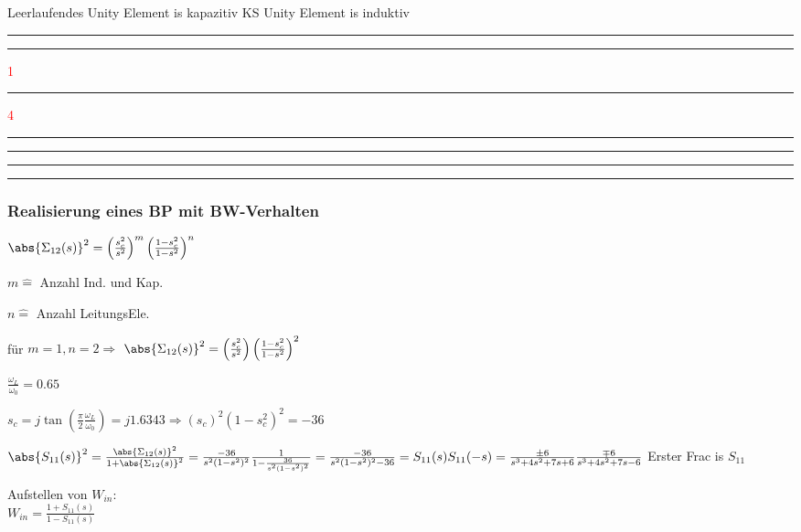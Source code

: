 Leerlaufendes Unity Element is kapazitiv
KS Unity Element is induktiv


\hrule
{}
\hrule
{}
\textcolor{red}{1}
\hrule
{}
\textcolor{red}{4}
\hrule
{}
\hrule
{}
\hrule
{}
\hrule
{}



\subsubsection{Realisierung eines BP mit BW-Verhalten}

$\abs{\Sigma_{12}(s)}^2 = \left(\frac{s_c^2}{s^2}\right)^m \left(\frac{1 - s_c^2}{1 - s^2}\right)^n$
\begin{pitemize}
    \item $m \hat{=}$ Anzahl Ind. und Kap.
    \item $n \hat{=}$ Anzahl LeitungsEle.
\end{pitemize}

für $m=1, n=2 \Rightarrow$
$\abs{\Sigma_{12}(s)}^2 = \left(\frac{s_c^2}{s^2}\right) \left(\frac{1 - s_c^2}{1 - s^2}\right)^2$


$\frac{\omega_L}{\omega_0} = 0.65$

$s_c = j \tan(\frac{\pi}{2} \frac{\omega_L}{\omega_0}) = j1.6343 \Rightarrow (s_c)^2(1 - s_c^2)^2 = -36$

$\abs{S_{11}(s)}^2 = \frac{\abs{\Sigma_{12}(s)}^2}{1 + \abs{\Sigma_{12}(s)}^2} = \frac{-36}{s^2 (1- s^2)^2} \frac{1}{1 - \frac{36}{s^2 (1- s^2)^2}} = \frac{-36}{s^2(1-s^2)^2 - 36} = S_{11}(s)S_{11}(-s) = \frac{\pm 6}{s^3 + 4s^2 + 7s + 6} \frac{\mp 6}{s^3 + 4s^2 + 7s - 6}$ Erster Frac is $S_{11}$

Aufstellen von $W_{in}$:\\
$W_{in} = \frac{1 + S_{11}(s)}{1 - S_{11}(s)}$

